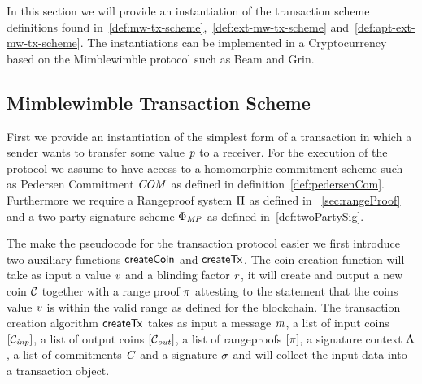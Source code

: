 In this section we will provide an instantiation of the transaction scheme definitions found in~\ref{def:mw-tx-scheme},~\ref{def:ext-mw-tx-scheme} and~\ref{def:apt-ext-mw-tx-scheme}. The instantiations can be
implemented in a Cryptocurrency based on the Mimblewimble protocol such as Beam and Grin.

\subsection{Mimblewimble Transaction Scheme}

First we provide an instantiation of the simplest form of a transaction in which a sender wants to transfer some value $\mathit{p}$ to a receiver. For the execution of the protocol we assume to have access to a homomorphic
commitment scheme such as Pedersen Commitment $\mathit{COM}$ as defined in definition~\ref{def:pedersenCom}. Furthermore we require a Rangeproof system $\Pi$ as defined in
~\ref{sec:rangeProof} and a two-party signature scheme $\Phi_{\mathit{MP}}$ as defined in~\ref{def:twoPartySig}.

The make the pseudocode for the transaction protocol easier we first introduce two auxiliary functions $\mathsf{createCoin}$
and $\mathsf{createTx}$. The coin creation function will take as input a value $\mathit{v}$ and a blinding factor $\mathit{r}$, it will create and output a new coin $\mathcal{C}$ together with a range proof
$\pi$ attesting to the statement that the coins value $\mathit{v}$ is within the valid range as defined for the blockchain.
The transaction creation algorithm $\mathsf{createTx}$ takes as input a message $\mathit{m}$, a list of input coins $[\mathcal{C}_{\mathit{inp}}]$, a list of output coins $[\mathcal{C}_{\mathit{out}}]$, a list of rangeproofs
$[\pi]$, a signature context $\Lambda$, a list of commitments $\mathit{C}$ and a signature $\sigma$ and will collect the input data into a transaction object.


